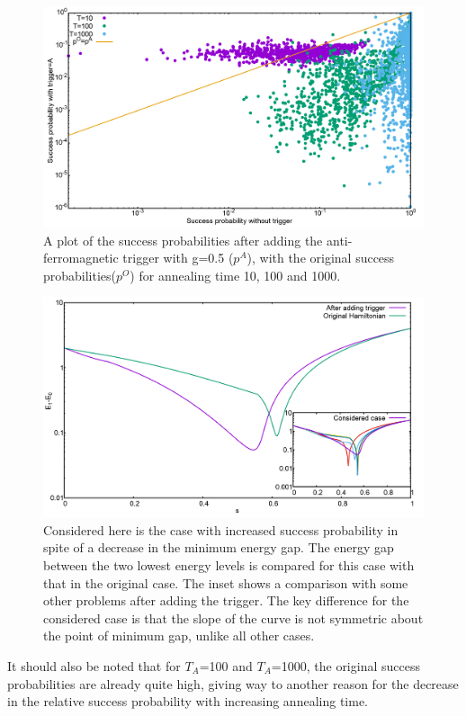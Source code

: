 \documentclass[12]{article}
\begin{document}
\begin{figure}[H]
\centering 
\includegraphics[scale=0.3]{ProbScat_g0.png}
\caption{A plot of the success probabilities after adding the anti-ferromagnetic trigger with g=0.5 ($p^A$), with the original success probabilities($p^O$) for annealing time 10, 100 and 1000.}
\label{fig:a14}
\end{figure}

\begin{figure}[H]
\centering 
\includegraphics[scale=0.3]{Mingap_709_g0_A.png}
\caption{Considered here is the case with increased success probability in spite of a decrease in the minimum energy gap. The energy gap between the two lowest energy levels is compared for this case with that in the original case. The inset shows a comparison with some other problems after adding the trigger. The key difference for the considered case is that the slope of the curve is not symmetric about the point of minimum gap, unlike all other cases. }
\label{fig:a15}
\end{figure}
 
It should also be noted that for $T_A$=100 and $T_A$=1000, the original success probabilities are already quite high, giving way to another reason for the decrease in the relative success probability with increasing annealing time. \\
\end{document}
